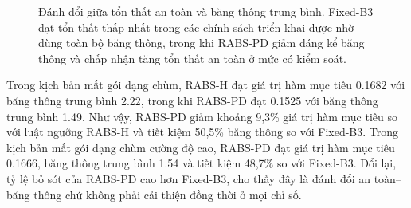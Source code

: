 \documentclass[10pt]{article}
\begin{document}
\begin{figure}[ht]
\centering
{}
\caption{Đánh đổi giữa tổn thất an toàn và băng thông trung bình. Fixed-B3 đạt tổn thất thấp nhất trong các chính sách triển khai được nhờ dùng toàn bộ băng thông, trong khi RABS-PD giảm đáng kể băng thông và chấp nhận tăng tổn thất an toàn ở mức có kiểm soát.}
\label{fig:rabs_tradeoff_burst}
\end{figure}

\begin{table}[ht]
\centering
\caption{Khoảng cách của RABS-H/RABS-PD so với mốc Oracle-B theo hàm mục tiêu.}
\label{tab:rabs_oracle_gap}
\resizebox{0.90\linewidth}{!}{}
\end{table}

Trong kịch bản mất gói dạng chùm, RABS-H đạt giá trị hàm mục tiêu 0.1682 với băng thông trung bình 2.22, trong khi RABS-PD đạt 0.1525 với băng thông trung bình 1.49. Như vậy, RABS-PD giảm khoảng 9,3\% giá trị hàm mục tiêu so với luật ngưỡng RABS-H và tiết kiệm 50,5\% băng thông so với Fixed-B3. Trong kịch bản mất gói dạng chùm cường độ cao, RABS-PD đạt giá trị hàm mục tiêu 0.1666, băng thông trung bình 1.54 và tiết kiệm 48,7\% so với Fixed-B3. Đổi lại, tỷ lệ bỏ sót của RABS-PD cao hơn Fixed-B3, cho thấy đây là đánh đổi an toàn--băng thông chứ không phải cải thiện đồng thời ở mọi chỉ số.
\end{document}
